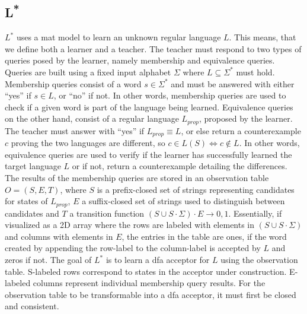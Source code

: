 \subsection{L\textsuperscript{*}}
$L^*$ uses a \ac{mat} model to learn an unknown regular language $L$. This means, that we define both a learner and a teacher. The teacher must respond to two types of queries posed by the learner, namely membership and equivalence queries. Queries are built using a fixed input alphabet $\Sigma$ where $L \subseteq \Sigma^*$ must hold. Membership queries consist of a word $s \in \Sigma^*$ and must be answered with either ``yes'' if $s \in L$, or ``no'' if not. In other words, membership queries are used to check if a given word is part of the language being learned. Equivalence queries on the other hand, consist of a regular language $L_{prop}$, proposed by the learner. The teacher must answer with  ``yes'' if $L_{prop} \equiv L$, or else return a counterexample $c$ proving the two languages are different, so $c \in L(S) \iff c \notin L$. In other words, equivalence queries are used to verify if the learner has successfully learned the target language $L$ or if not, return a counterexample detailing the differences. The results of the membership queries are stored in an observation table $O = (S,E,T)$, where $S$ is a prefix-closed set of strings representing candidates for states of $L_{prop}$, $E$ a suffix-closed set of strings used to distinguish between candidates and $T$ a transition function $(S \cup S \cdot \Sigma) \cdot E \rightarrow {0,1}$. Essentially, if visualized as a 2D array where the rows are labeled with elements in $(S \cup S \cdot \Sigma)$ and columns with elements in $E$, the entries in the table are ones, if the word created by appending the row-label to the column-label is accepted by $L$ and zeros if not. 
The goal of $L^*$ is to learn a \ac{dfa} acceptor for $L$ using the observation table. S-labeled rows correspond to states in the acceptor under construction. E-labeled columns represent individual membership query results. For the observation table to be transformable into a \ac{dfa} acceptor, it must first be closed and consistent.


